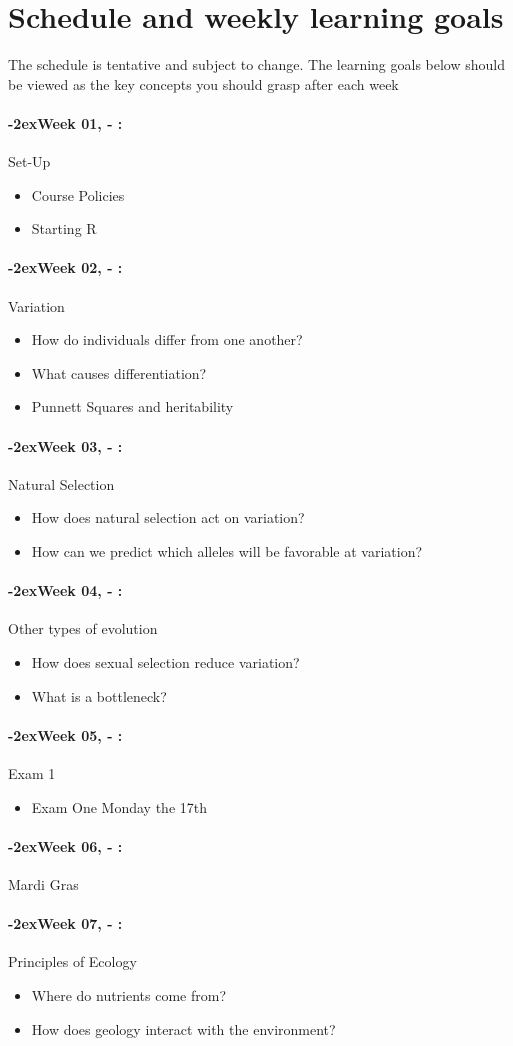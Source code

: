\documentclass[11pt]{article}
\newcommand{\week}[1]{%
  \paragraph*{\kern-2ex\quad #1, \syldate{\today} - \AdvanceDate[4]\syldate{\today}:}%
  \ifdim\wd1=\wd\MONDAY
    \AdvanceDate[7]
  \else
    \AdvanceDate[7]
  \fi%
}
\begin{document}

\newpage



\newpage
\section*{Schedule and weekly learning goals}

The schedule is tentative and subject to change. The learning goals below should be viewed as the key concepts you should grasp after each week

\SetDate[13/01/2020]
\week{Week 01} Set-Up
\begin{itemize}
\item Course Policies
\item Starting R
\end{itemize}

\week{Week 02} Variation
\begin{itemize}
\item How do individuals differ from one another?
\item What causes differentiation?
\item Punnett Squares and heritability
\end{itemize}

\week{Week 03} Natural Selection 
\begin{itemize}
\item How does natural selection act on variation?
\item How can we predict which alleles will be favorable at variation?
\end{itemize}

\week{Week 04} Other types of evolution
\begin{itemize}
\item How does sexual selection reduce variation? 
\item What is a bottleneck?
\end{itemize}

\week{Week 05} Exam 1
\begin{itemize}
\item Exam One Monday the 17th
\end{itemize}

\week{Week 06} Mardi Gras


\week{Week 07} Principles of Ecology
\begin{itemize}
\item Where do nutrients come from?
\item How does geology interact with the environment?
\end{itemize}
\end{document}
